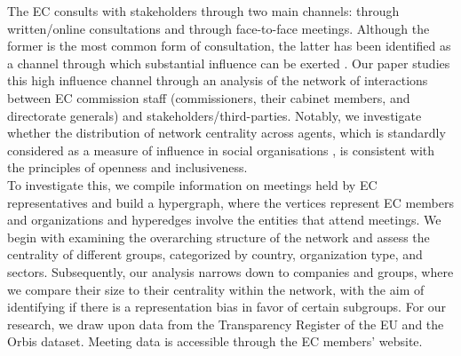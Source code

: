 \documentclass[ 11pt]{article}
\begin{document}
The EC consults with stakeholders through two main channels: through written/online consultations and through face-to-face meetings. Although the  former is the most common form of consultation, the latter has been identified as a channel through which substantial influence can be exerted \parencite{heinz_hollow_1997,noah_efriedkin_social_1998,zeng_multiplex_2016,pappi_organization_1999}. Our paper studies this high influence channel through an analysis of the network of interactions between EC commission staff (commissioners, their cabinet members, and directorate generals) and stakeholders/third-parties. Notably, we investigate whether the distribution of network centrality across agents, which is standardly considered as a measure of influence in social organisations \parencite{jackson2008social}, is consistent with the principles of openness and inclusiveness. \\
To investigate this, we compile information on meetings held by EC representatives and build a hypergraph, where the vertices represent EC members and organizations and hyperedges involve the entities that attend meetings.  
We begin with examining the overarching structure of the network and assess the centrality of different groups, categorized by country, organization type, and sectors.
Subsequently, our analysis narrows down to companies and groups, where we compare their size to their centrality within the network, with the aim of identifying if there is a representation bias in favor of certain subgroups.  
For our research, we draw upon data from the Transparency Register of the EU and the Orbis dataset. Meeting data is accessible through the EC members' website. \\
\end{document}
